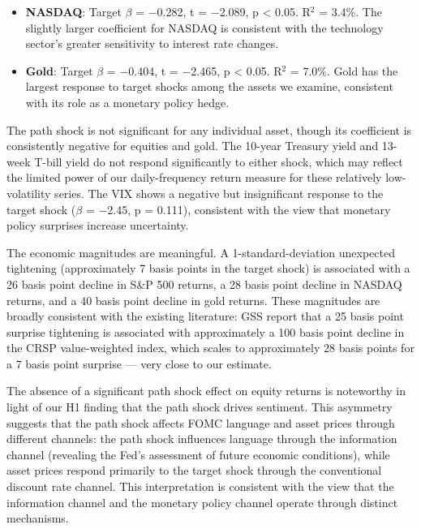 \begin{itemize}
\item \textbf{NASDAQ}: Target $\beta$ = $-$0.282, t = $-$2.089, p < 0.05. R$^2$ = 3.4\%. The slightly larger coefficient for NASDAQ is consistent with the technology sector's greater sensitivity to interest rate changes.
\end{itemize}

\begin{itemize}
\item \textbf{Gold}: Target $\beta$ = $-$0.404, t = $-$2.465, p < 0.05. R$^2$ = 7.0\%. Gold has the largest response to target shocks among the assets we examine, consistent with its role as a monetary policy hedge.
\end{itemize}

The path shock is not significant for any individual asset, though its coefficient is consistently negative for equities and gold. The 10-year Treasury yield and 13-week T-bill yield do not respond significantly to either shock, which may reflect the limited power of our daily-frequency return measure for these relatively low-volatility series. The VIX shows a negative but insignificant response to the target shock ($\beta$ = $-$2.45, p = 0.111), consistent with the view that monetary policy surprises increase uncertainty.

The economic magnitudes are meaningful. A 1-standard-deviation unexpected tightening (approximately 7 basis points in the target shock) is associated with a 26 basis point decline in S\&P 500 returns, a 28 basis point decline in NASDAQ returns, and a 40 basis point decline in gold returns. These magnitudes are broadly consistent with the existing literature: GSS report that a 25 basis point surprise tightening is associated with approximately a 100 basis point decline in the CRSP value-weighted index, which scales to approximately 28 basis points for a 7 basis point surprise --- very close to our estimate.

The absence of a significant path shock effect on equity returns is noteworthy in light of our H1 finding that the path shock drives sentiment. This asymmetry suggests that the path shock affects FOMC language and asset prices through different channels: the path shock influences language through the information channel (revealing the Fed's assessment of future economic conditions), while asset prices respond primarily to the target shock through the conventional discount rate channel. This interpretation is consistent with the view that the information channel and the monetary policy channel operate through distinct mechanisms.


